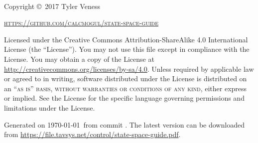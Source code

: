 ~\vfill
\thispagestyle{empty}

Copyright \copyright\ 2017 Tyler Veness

\textsc{\url{https://github.com/calcmogul/state-space-guide}}

Licensed under the Creative Commons Attribution-ShareAlike 4.0 International
License (the ``License''). You may not use this file except in compliance with
the License. You may obtain a copy of the License at
\url{http://creativecommons.org/licenses/by-sa/4.0}. Unless required by
applicable law or agreed to in writing, software distributed under the License
is distributed on an \textsc{``as is'' basis, without warranties or conditions
of any kind}, either express or implied. See the License for the specific
language governing permissions and limitations under the License.

Generated on \monthdayyeardate\today~from commit
\!\!. The latest version can be downloaded from
\url{https://file.tavsys.net/control/state-space-guide.pdf}.
